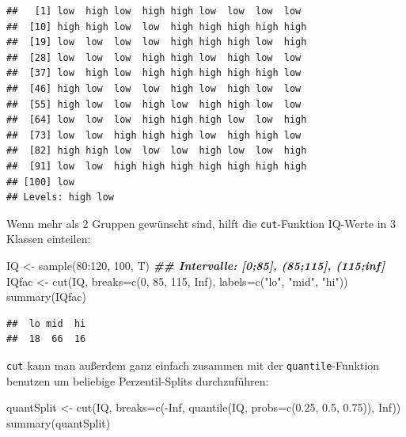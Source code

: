\documentclass[
]{book}
\newenvironment{Shaded}{\begin{snugshade}}{\end{snugshade}}
\newcommand{\AttributeTok}[1]{\textcolor[rgb]{0.77,0.63,0.00}{#1}}
\newcommand{\ConstantTok}[1]{\textcolor[rgb]{0.00,0.00,0.00}{#1}}
\newcommand{\DecValTok}[1]{\textcolor[rgb]{0.00,0.00,0.81}{#1}}
\newcommand{\DocumentationTok}[1]{\textcolor[rgb]{0.56,0.35,0.01}{\textbf{\textit{#1}}}}
\newcommand{\FloatTok}[1]{\textcolor[rgb]{0.00,0.00,0.81}{#1}}
\newcommand{\FunctionTok}[1]{\textcolor[rgb]{0.00,0.00,0.00}{#1}}
\newcommand{\NormalTok}[1]{#1}
\newcommand{\OtherTok}[1]{\textcolor[rgb]{0.56,0.35,0.01}{#1}}
\newcommand{\SpecialCharTok}[1]{\textcolor[rgb]{0.00,0.00,0.00}{#1}}
\newcommand{\StringTok}[1]{\textcolor[rgb]{0.31,0.60,0.02}{#1}}
\begin{document}
\begin{verbatim}
##   [1] low  high low  high high low  low  low  low 
##  [10] high high low  low  high high high high high
##  [19] low  low  low  low  high high high low  high
##  [28] low  low  low  high high low  high low  low 
##  [37] low  high low  high high high high high low 
##  [46] high low  low  low  high low  high low  low 
##  [55] high low  low  high low  high high low  low 
##  [64] low  low  low  high high high low  low  high
##  [73] low  low  high high high low  high high low 
##  [82] high high low  low  low  high low  low  high
##  [91] low  low  high high high high high high high
## [100] low 
## Levels: high low
\end{verbatim}

Wenn mehr als 2 Gruppen gewünscht sind, hilft die \texttt{cut}-Funktion
IQ-Werte in 3 Klassen einteilen:

\begin{Shaded}
\begin{Highlighting}[]
\NormalTok{IQ }\OtherTok{\textless{}{-}} \FunctionTok{sample}\NormalTok{(}\DecValTok{80}\SpecialCharTok{:}\DecValTok{120}\NormalTok{, }\DecValTok{100}\NormalTok{, T)}
\DocumentationTok{\#\# Intervalle: [0;85], (85;115], (115;inf]}
\NormalTok{IQfac }\OtherTok{\textless{}{-}} \FunctionTok{cut}\NormalTok{(IQ, }\AttributeTok{breaks=}\FunctionTok{c}\NormalTok{(}\DecValTok{0}\NormalTok{, }\DecValTok{85}\NormalTok{, }\DecValTok{115}\NormalTok{, }\ConstantTok{Inf}\NormalTok{), }
             \AttributeTok{labels=}\FunctionTok{c}\NormalTok{(}\StringTok{"lo"}\NormalTok{, }\StringTok{"mid"}\NormalTok{, }\StringTok{"hi"}\NormalTok{))}
\FunctionTok{summary}\NormalTok{(IQfac)}
\end{Highlighting}
\end{Shaded}

\begin{verbatim}
##  lo mid  hi 
##  18  66  16
\end{verbatim}

\texttt{cut} kann man außerdem ganz einfach zusammen mit der \texttt{quantile}-Funktion benutzen um beliebige Perzentil-Splits durchzuführen:

\begin{Shaded}
\begin{Highlighting}[]
\NormalTok{quantSplit }\OtherTok{\textless{}{-}} \FunctionTok{cut}\NormalTok{(IQ,}
                  \AttributeTok{breaks=}\FunctionTok{c}\NormalTok{(}\SpecialCharTok{{-}}\ConstantTok{Inf}\NormalTok{, }
                           \FunctionTok{quantile}\NormalTok{(IQ, }
                                    \AttributeTok{probs=}\FunctionTok{c}\NormalTok{(}\FloatTok{0.25}\NormalTok{,}
                                            \FloatTok{0.5}\NormalTok{, }
                                            \FloatTok{0.75}\NormalTok{)), }
                           \ConstantTok{Inf}\NormalTok{))}
\FunctionTok{summary}\NormalTok{(quantSplit)}
\end{Highlighting}
\end{Shaded}
\end{document}
